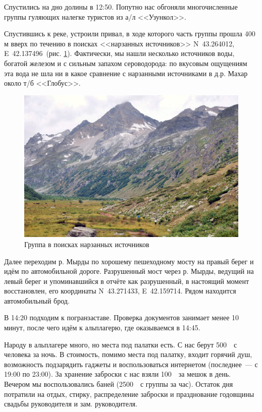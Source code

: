 Спустились на дно долины в 12:50. Попутно нас обгоняли многочисленные группы гуляющих налегке туристов из а/л <<Узункол>>.

Спустившись к реке, устроили привал, в ходе которого часть группы прошла 400 м вверх по течению в поисках <<нарзанных источников>> N~43.264012\degree, E~42.137496\degree~(рис. \ref{fig:DSC_0111.JPG}). Фактически, мы нашли несколько источников воды, богатой железом и с сильным запахом сероводорода: по вкусовым ощущениям эта вода не шла ни в какое сравнение с нарзанными источниками в д.р. Махар около т/б <<Глобус>>.

\begin{figure}[h!]
	\centering
	\includegraphics[width=0.7\linewidth]{../pics/DSC_0111.JPG}
	\caption{Группа в поисках нарзанных источников}
	\label{fig:DSC_0111.JPG}
\end{figure}

Далее переходим р. Мырды по хорошему пешеходному мосту на правый берег и идём по автомобильной дороге. Разрушенный мост через р. Мырды, ведущий на левый берег и упоминавшийся в отчёте \cite{Korolyov2018} как разрушенный, в настоящий момент восстановлен, его координаты N~43.271433\degree, E~42.159714\degree. Рядом находится автомобильный брод.

В 14:20 подходим к погранзаставе. Проверка документов занимает менее 10 минут, после чего идём к альплагерю, где оказываемся в 14:45.

Народу в альплагере много, но места под палатки есть. С нас берут 500~\faRub~с человека за ночь. В стоимость, помимо места под палатку, входит горячий душ, возможность подзарядить гаджеты и воспользоваться интернетом (последнее~--- с 19:00 по 23:00). За хранение заброски с нас взяли 100~\faRub~за мешок в день. Вечером мы воспользовались баней (2500~\faRub~с группы за час). Остаток дня потратили на отдых, стирку, распределение заброски и празднование годовщины свадьбы руководителя и зам. руководителя.



\newpage